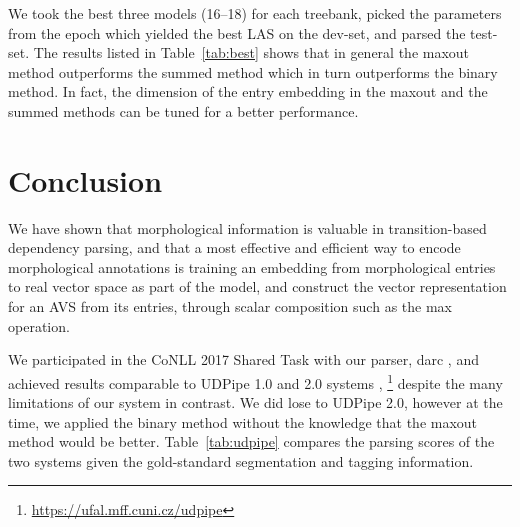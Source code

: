 \documentclass[11pt]{article}
\begin{document}
We took the best three models (16--18) for each treebank,
picked the parameters from the epoch which yielded the best LAS on the dev-set,
and parsed the test-set.
The results listed in Table~\ref{tab:best} shows that in general
the maxout method outperforms the summed method which in turn outperforms the binary method.
In fact, the dimension of the entry embedding in the maxout and the summed methods can be tuned for a better performance.

\section{Conclusion}
\label{sec:conc}

We have shown that morphological information is valuable in transition-based dependency parsing,
and that a most effective and efficient way to encode morphological annotations is training an embedding from morphological entries to real vector space as part of the model,
and construct the vector representation for an AVS from its entries,
through scalar composition such as the max operation.

We participated in the CoNLL 2017 Shared Task with our parser, darc \parencite{yu2017parse},
and achieved results comparable to UDPipe 1.0 and 2.0 systems \parencite{udpipe},%
\footnote{\url{https://ufal.mff.cuni.cz/udpipe}}
despite the many limitations of our system in contrast.
We did lose to UDPipe 2.0,
however at the time, we applied the binary method without the knowledge that the maxout method would be better.
Table~\ref{tab:udpipe} compares the parsing scores of the two systems given the gold-standard segmentation and tagging information.
\end{document}
